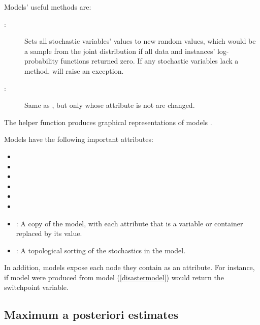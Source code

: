 \documentclass[]{jss}
\begin{document}
Models' useful methods are:
\begin{description}
    \item[:] Sets all stochastic variables' values to new random values, which would be a sample from the joint distribution if all data and  instances' log-probability functions returned zero. If any stochastic variables lack a  method,  will raise an exception.
    \item[:] Same as , but only  whose  attribute is not  are changed.
\end{description}

The helper function  produces graphical representations of models \cite[see]{Jordan:2004p5439}.

Models have the following important attributes:
\begin{itemize}
    \item {}
    \item {}
    \item {}
    \item {}
    \item {}
    \item {}
    \item {}: A copy of the model, with each attribute that is a  variable or container replaced by its value.
    \item {}: A topological sorting of the stochastics in the model.
\end{itemize}

In addition, models expose each node they contain as an attribute. For instance, if model  were produced from model (\ref{disastermodel})  would return the switchpoint variable.


\subsection{Maximum a posteriori estimates} \label{sec:MAP}
\end{document}
